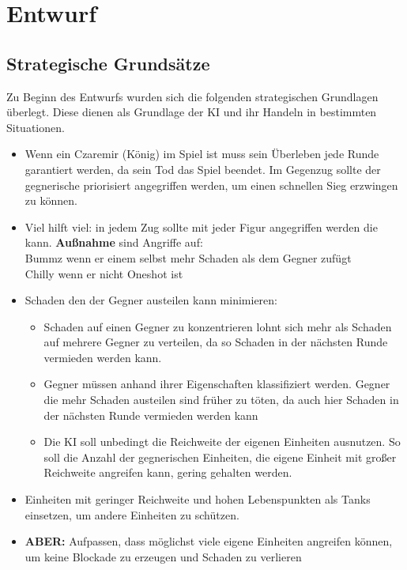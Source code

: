 

\chapter{Entwurf}

\section{Strategische Grundsätze}

Zu Beginn des Entwurfs wurden sich die folgenden strategischen Grundlagen überlegt. Diese dienen als Grundlage der KI und ihr Handeln in bestimmten Situationen. 

\begin{itemize}
	\item Wenn ein Czaremir (König) im Spiel ist muss sein Überleben jede Runde garantiert werden, da sein Tod das Spiel beendet. Im Gegenzug sollte der gegnerische priorisiert angegriffen werden, um einen schnellen Sieg erzwingen zu können.
	\item Viel hilft viel: in jedem Zug sollte mit jeder Figur angegriffen werden die kann. 
	\textbf{Außnahme} sind Angriffe auf:\\
	Bummz wenn er einem selbst mehr Schaden als dem Gegner zufügt\\
	Chilly wenn er nicht \glqq Oneshot\grqq{} ist
	\item Schaden den der Gegner austeilen kann minimieren:
	\begin{itemize}
		\item Schaden auf einen Gegner zu konzentrieren lohnt sich mehr als Schaden auf mehrere Gegner zu verteilen, da so Schaden in der nächsten Runde vermieden werden kann.
		\item Gegner müssen anhand ihrer Eigenschaften klassifiziert werden. Gegner die mehr Schaden austeilen sind früher zu töten, da auch hier Schaden in der nächsten Runde vermieden werden kann
		\item Die KI soll unbedingt die Reichweite der eigenen Einheiten ausnutzen. So soll die Anzahl der gegnerischen Einheiten, die eigene Einheit mit großer Reichweite angreifen kann, gering gehalten werden.
	\end{itemize}
	\item Einheiten mit geringer Reichweite und hohen Lebenspunkten als \glqq Tanks\grqq{} einsetzen, um andere Einheiten zu schützen.
	\item \textbf{ABER:} Aufpassen, dass möglichst viele eigene Einheiten angreifen können, um keine Blockade zu erzeugen und Schaden zu \glqq verlieren\grqq{}
\end{itemize}